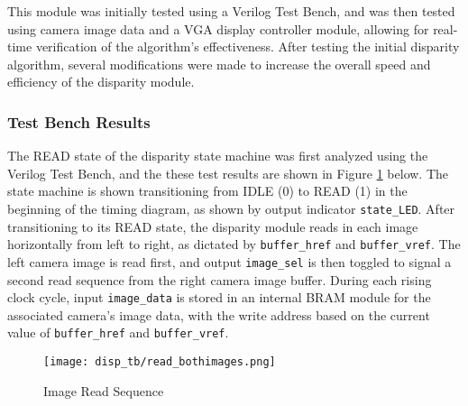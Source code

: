 \par
This module was initially tested using a Verilog Test Bench, and was then tested using camera image data and a VGA display controller module, allowing for real-time verification of the algorithm's effectiveness. After testing the initial disparity algorithm, several modifications were made to increase the overall speed and efficiency of the disparity module. 
\subsubsection{Test Bench Results}
The READ state of the disparity state machine was first analyzed using the Verilog Test Bench, and the these test results are shown in Figure \ref{disparityImgRead} below. The state machine is shown transitioning from IDLE (0) to READ (1) in the beginning of the timing diagram, as shown by output indicator \texttt{state\_LED}. After transitioning to its READ state, the disparity module reads in each image horizontally from left to right, as dictated by \texttt{buffer\_href} and \texttt{buffer\_vref}. The left camera image is read first, and output \texttt{image\_sel} is then toggled to signal a second read sequence from the right camera image buffer. During each rising clock cycle, input \texttt{image\_data} is stored in an internal BRAM module for the associated camera's image data, with the write address based on the current value of \texttt{buffer\_href} and \texttt{buffer\_vref}. 

\par
\begin{figure}[H]
	\centerline{\texttt{[image: disp\_tb/read\_bothimages.png]}}
	\caption{Image Read Sequence}
	\label{disparityImgRead}
\end{figure}
\par

